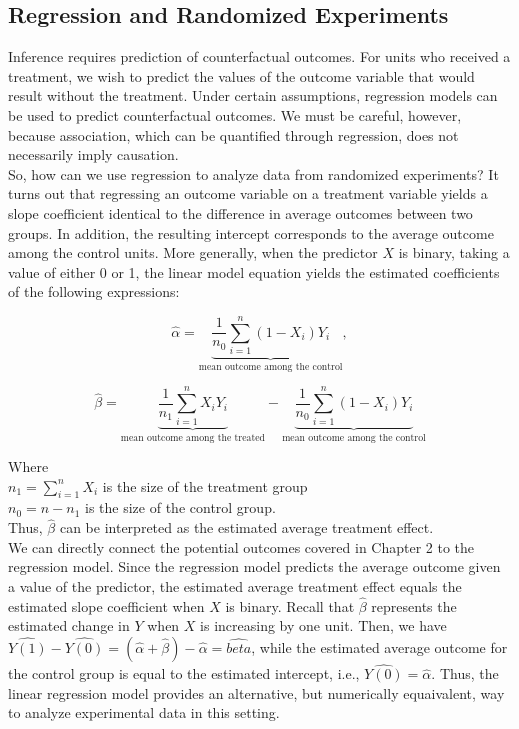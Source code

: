 \documentclass{article}
\begin{document}
    \subsection{Regression and Randomized Experiments}

    \noindent Inference requires prediction of counterfactual outcomes. For
units who received a treatment, we wish to predict the values of the outcome
variable that would result without the treatment. Under certain assumptions,
regression models can be used to predict counterfactual outcomes. We must be
careful, however, because association, which can be quantified through
regression, does not necessarily imply causation.\\

    \noindent So, how can we use regression to analyze data from randomized
experiments? It turns out that regressing an outcome variable on a treatment
variable yields a slope coefficient identical to the difference in average
outcomes between two groups. In addition, the resulting intercept
corresponds to the average outcome among the control units. More generally,
when the predictor $X$ is binary, taking a value of either 0 or 1, the
linear model equation yields the estimated coefficients of the following
expressions:

    \[
        \hat{\alpha} = \underbrace{
        \frac{1}{n_0}\sum^{n}_{i=1}(1-X_i)Y_i
        }_{\text{mean outcome among the control}},
    \]

    \[
        \hat{\beta} = \underbrace{
        \frac{1}{n_1}\sum^{n}_{i=1}X_iY_i
        }_{\text{mean outcome among the treated}} - \underbrace{
        \frac{1}{n_0}\sum^{n}_{i=1}(1-X_i)Y_i
        }_{\text{mean outcome among the control}}
    \]

    \indent Where \\
    \indent \indent $n_1 = \sum^{n}_{i=1}X_i$ is the size of the treatment
group \\
    \indent \indent $n_0 = n-n_1$ is the size of the control group.\\
    \indent Thus, $\hat{\beta}$ can be interpreted as the estimated average
treatment effect. \\

    \noindent We can directly connect the potential outcomes covered in
Chapter 2 to the regression model. Since the regression model predicts the
average outcome given a value of the predictor, the estimated average
treatment effect equals the estimated slope coefficient when $X$ is binary.
Recall that $\hat{\beta}$ represents the estimated change in $Y$ when $X$ is
increasing by one unit. Then, we have
$\hat{Y(1)} - \hat{Y(0)} = (\hat{\alpha} + \hat{\beta}) - \hat{\alpha} = \hat{beta}$, while the estimated average outcome for the control group is equal to the estimated intercept, i.e., $\hat{Y(0)} = \hat{\alpha}$. Thus, the linear regression model provides an alternative, but numerically equaivalent, way to analyze experimental data in this setting.
\end{document}
